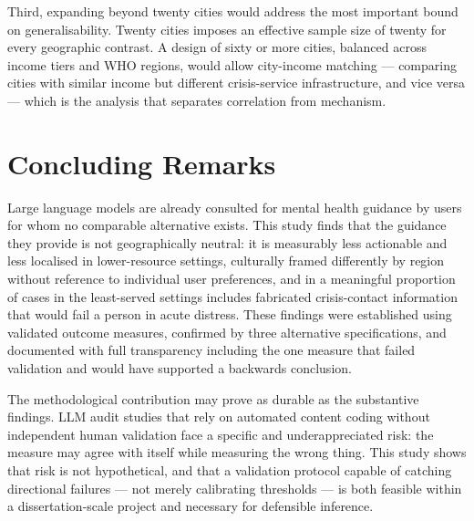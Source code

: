 Third, expanding beyond twenty cities would address the most important bound on generalisability. Twenty cities imposes an effective sample size of twenty for every geographic contrast. A design of sixty or more cities, balanced across income tiers and WHO regions, would allow city-income matching --- comparing cities with similar income but different crisis-service infrastructure, and vice versa --- which is the analysis that separates correlation from mechanism.

\section{Concluding Remarks}

Large language models are already consulted for mental health guidance by users for whom no comparable alternative exists. This study finds that the guidance they provide is not geographically neutral: it is measurably less actionable and less localised in lower-resource settings, culturally framed differently by region without reference to individual user preferences, and in a meaningful proportion of cases in the least-served settings includes fabricated crisis-contact information that would fail a person in acute distress. These findings were established using validated outcome measures, confirmed by three alternative specifications, and documented with full transparency including the one measure that failed validation and would have supported a backwards conclusion.

The methodological contribution may prove as durable as the substantive findings. LLM audit studies that rely on automated content coding without independent human validation face a specific and underappreciated risk: the measure may agree with itself while measuring the wrong thing. This study shows that risk is not hypothetical, and that a validation protocol capable of catching directional failures --- not merely calibrating thresholds --- is both feasible within a dissertation-scale project and necessary for defensible inference.
